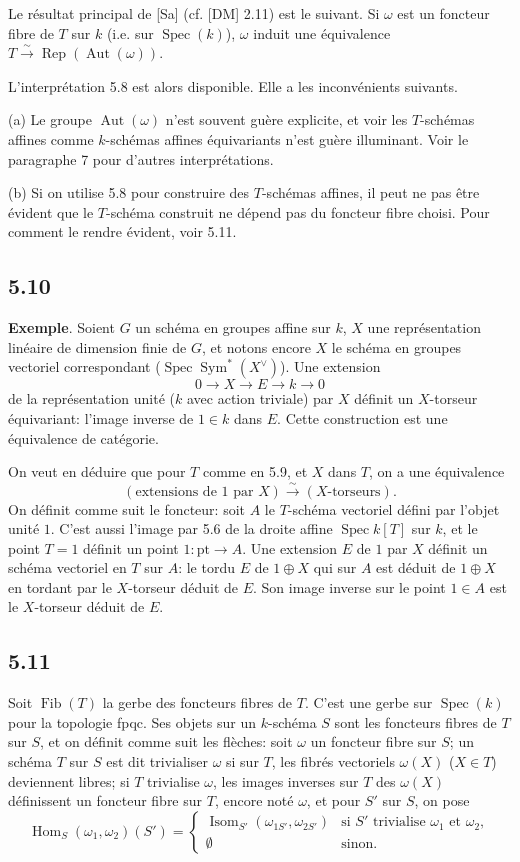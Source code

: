 \documentclass[12pt,a4paper]{article}
\theoremstyle{plain}
\theoremstyle{definition}
\theoremstyle{remark}
\DeclareMathOperator{\Aut}{Aut}
\DeclareMathOperator{\Hom}{Hom}
\DeclareMathOperator{\Spec}{Spec}
\DeclareMathOperator{\Rep}{Rep}
\DeclareMathOperator{\Sym}{Sym}
\DeclareMathOperator{\Isom}{Isom}
\DeclareMathOperator{\Fib}{Fib}
\newcommand{\pt}{\mathrm{pt}}
\begin{document}
Le résultat principal de [Sa] (cf. [DM] 2.11) est le suivant. Si $\omega$ est un foncteur fibre de $T$ sur $k$ (i.e. sur $\Spec(k)$), $\omega$ induit une équivalence $T 
\xrightarrow{\sim} 
\Rep(\Aut(\omega))$.

L'interprétation 5.8 est alors disponible. Elle a les inconvénients suivants.

(a) Le groupe $\Aut(\omega)$ n'est souvent guère explicite, et voir les $T$-schémas affines comme $k$-schémas affines équivariants n'est guère illuminant. Voir le paragraphe 7 pour d'autres interprétations.

(b) Si on utilise 5.8 pour construire des $T$-schémas affines, il peut ne pas être évident que le $T$-schéma construit ne dépend pas du foncteur fibre choisi. Pour comment le rendre évident, voir 5.11.

\subsection*{5.10}
\textbf{Exemple}. Soient $G$ un schéma en groupes affine sur $k$, $X$ une représentation linéaire de dimension finie de $G$, et notons encore $X$ le schéma en groupes vectoriel correspondant ($\Spec 
\Sym^*(X^\vee)$). Une extension
\[
0 
\longrightarrow X 
\longrightarrow E 
\longrightarrow k 
\longrightarrow 0
\]
de la représentation unité ($k$ avec action triviale) par $X$ définit un $X$-torseur équivariant: l'image inverse de $1 
\in k$ dans $E$. Cette construction est une équivalence de catégorie.

On veut en déduire que pour $T$ comme en 5.9, et $X$ dans $T$, on a une équivalence
\[
(\text{extensions de } 1 \text{ par } X) 
\xrightarrow{\sim} (X\text{-torseurs}).
\]
On définit comme suit le foncteur: soit $A$ le $T$-schéma vectoriel défini par l'objet unité $1$. C'est aussi l'image par 5.6 de la droite affine $\Spec k[T]$ sur $k$, et le point $T=1$ définit un point $1: 
\pt 
\to A$. Une extension $E$ de $1$ par $X$ définit un schéma vectoriel en $T$ sur $A$: le tordu $E$ de $1 
\oplus X$ qui sur $A$ est déduit de $1 
\oplus X$ en tordant par le $X$-torseur déduit de $E$. Son image inverse sur le point $1 
\in A$ est le $X$-torseur déduit de $E$.

\subsection*{5.11}
Soit $\Fib(T)$ la gerbe des foncteurs fibres de $T$. C'est une gerbe sur $\Spec(k)$ pour la topologie fpqc. Ses objets sur un $k$-schéma $S$ sont les foncteurs fibres de $T$ sur $S$, et on définit comme suit les flèches: soit $\omega$ un foncteur fibre sur $S$; un schéma $T$ sur $S$ est dit trivialiser $\omega$ si sur $T$, les fibrés vectoriels $\omega(X)$ ($X 
\in T$) deviennent libres; si $T$ trivialise $\omega$, les images inverses sur $T$ des $\omega(X)$ définissent un foncteur fibre sur $T$, encore noté $\omega$, et pour $S'$ sur $S$, on pose
\[
\Hom_S(\omega_1,\omega_2)(S') = 
\begin{cases}
\Isom_{S'}(\omega_{1S'}, \omega_{2S'}) & \text{si } S' \text{ trivialise } \omega_1 \text{ et } \omega_2,\\
\emptyset & \text{sinon.}
\end{cases}
\]
\end{document}

